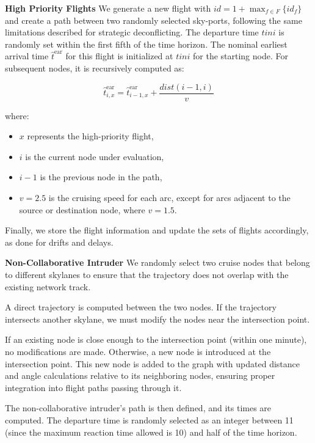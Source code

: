 \documentclass[../../thesis.tex]{subfiles}
\begin{document}
\textbf{High Priority Flights}  
\newline
We generate a new flight with \( id = 1 + \max_{f\in F}\{id_f\} \) and create a path between two randomly selected sky-ports, following the same limitations described for strategic deconflicting.  
The departure time \( tini \) is randomly set within the first fifth of the time horizon. The nominal earliest arrival time \( \hat{t}^\text{ear} \) for this flight is initialized at \( tini \) for the starting node. For subsequent nodes, it is recursively computed as:  

\[
\hat{t}^\text{ear}_{i,x} = \hat{t}^\text{ear}_{i-1,x} + \frac{dist(i-1,i)}{v}
\]

where:  
\begin{itemize}
    \item \( x \) represents the high-priority flight,  
    \item \( i \) is the current node under evaluation,  
    \item \( i-1 \) is the previous node in the path,  
    \item \( v = 2.5 \) is the cruising speed for each arc, except for arcs adjacent to the source or destination node, where \( v = 1.5 \).  
\end{itemize}

Finally, we store the flight information and update the sets of flights accordingly, as done for drifts and delays.
\newline

\textbf{Non-Collaborative Intruder}  
\newline
We randomly select two cruise nodes that belong to different skylanes to ensure that the trajectory does not overlap with the existing network track.

A direct trajectory is computed between the two nodes. If the trajectory intersects another skylane, we must modify the nodes near the intersection point.  

If an existing node is close enough to the intersection point (within one minute), no modifications are made. Otherwise, a new node is introduced at the intersection point.  
This new node is added to the graph with updated distance and angle calculations relative to its neighboring nodes, ensuring proper integration into flight paths passing through it.  

The non-collaborative intruder’s path is then defined, and its times are computed. The departure time is randomly selected as an integer between 11 (since the maximum reaction time allowed is 10) and half of the time horizon.  
\end{document}
